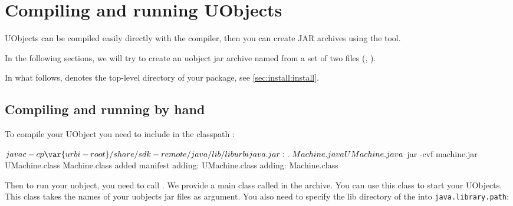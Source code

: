 \section{Compiling and running UObjects}

UObjects can be compiled easily directly with the  compiler,
then you can create JAR archives using the  tool.

In the following sections, we will try to create an uobject jar archive
named  from a set of two files (,
).

In what follows,  denotes the top-level directory of your
\usdk package, see \autoref{sec:install:install}.

\subsection{Compiling and running by hand}

To compile your UObject you need to include in the classpath
:

\begin{shell}
$ javac -cp \var{urbi-root}/share/sdk-remote/java/lib/liburbijava.jar:. \
  Machine.java UMachine.java
$ jar -cvf machine.jar UMachine.class Machine.class
added manifest
adding: UMachine.class
adding: Machine.class
\end{shell}

Then to run your uobject, you need to call . We provide a main
class called \code{urbi.UMain} in the \file{liburbijava.jar} archive.  You
can use this class to start your UObjects. This class takes the names of
your uobjects jar files as argument.  You also need to specify the lib
directory of the \usdk into \lstinline{java.library.path}:


